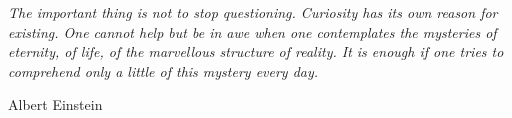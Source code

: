 \documentclass[12pt,a4paper]{article}
\begin{document}

    

    \restoregeometry %

\newpage
    \thispagestyle{empty} 
    \pagebreak
    \hspace{0pt}
    \vfill
    \begin{flushright}
        \textit{The important thing is not to stop questioning. Curiosity has its own reason for existing. One cannot help but be in awe when one contemplates the mysteries of eternity, of life, of the marvellous structure of reality. It is enough if one tries to comprehend only a little of this mystery every day.}\\
    
        \vspace{0.3em}
        
        \large{Albert Einstein}
    
    \end{flushright}
    \vfill
    \hspace{0pt}
\pagebreak

\setcounter{page}{1} %



\newpage

\tableofcontents
\newpage

\listoffigures
\newpage

\listoftables
\newpage


\setcounter{page}{1} %


\end{document}
